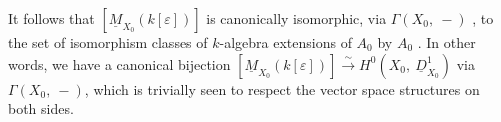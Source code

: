 \begin{center}
\end{center}
It follows that  $[\underline{M}_{X_{0}}(k[\varepsilon])]$  is canonically isomorphic, via  $\Gamma(X_{0},\ -)$ , to the set of isomorphism classes of $k$-algebra extensions of  $A_{0}$  by  $A_{0}$ . In other words, we have a canonical bijection  $[\underline{M}_{X_{0}}(k[\varepsilon])] \overset{\sim}{\longrightarrow} H^{0}(X_{0},\ \underline{D}^{1}_{X_{0}})$  via $\Gamma(X_{0},\ -)$, which is trivially seen to respect the vector space structures on both sides.



